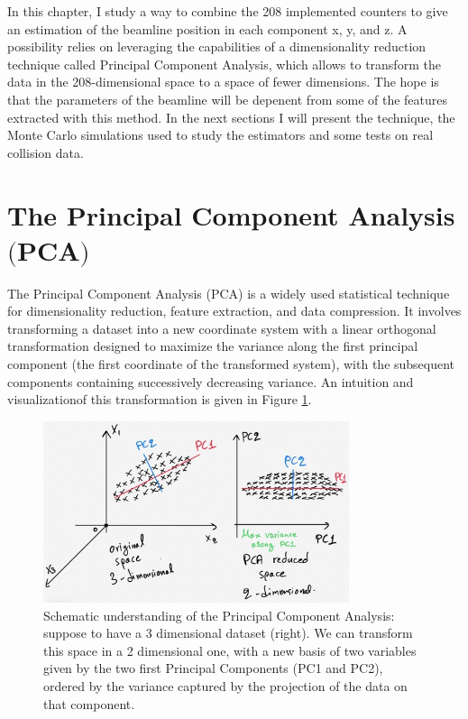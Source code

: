 In this chapter, I study a way to combine the 208 implemented counters to give an estimation of the beamline position in each component x, y, and z. A possibility relies on leveraging the capabilities of a dimensionality reduction technique called Principal Component Analysis, which allows to transform the data in the 208-dimensional space to a space of fewer dimensions. The hope is that the parameters of the beamline will be depenent from some of the features extracted with this method. In the next sections I will present the technique, the Monte Carlo simulations used to study the estimators and some tests on real collision data.



\section[The Principal Component Analysis]{The Principal Component Analysis $\bigl($PCA$\bigr)$}\label{sec:PCA}

The Principal Component Analysis (PCA) is a widely used statistical technique for dimensionality reduction, feature extraction, and data compression. It involves transforming a dataset into a new coordinate system with a linear orthogonal transformation designed to maximize the variance along the first principal component (the first coordinate of the transformed system), with the subsequent components containing successively decreasing variance.
An intuition and visualizationof this transformation is given in Figure \ref{fig:pca}.

\begin{figure}
    \centering
    \includegraphics[width=0.8\textwidth]{figures/pca.jpg}
    \caption{Schematic understanding of the Principal Component Analysis: suppose to have a 3 dimensional dataset (right). We can transform this space in a 2 dimensional one, with a new basis of two variables given by the two first Principal Components (PC1 and PC2), ordered by the variance captured by the projection of the data on that component.}
    \label{fig:pca}
\end{figure}


